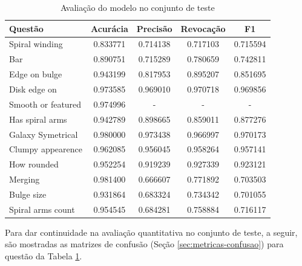 \begin{table}[!ht]
  \centering
  \caption{Avaliação do modelo no conjunto de teste}
  \label{tab:test-metrics}
  \begin{tabular}{lcccc}
    \toprule
    Questão            & Acurácia & Precisão & Revocação & F1       \\
    \midrule
    Spiral winding     & 0.833771 & 0.714138 & 0.717103  & 0.715594 \\
    Bar                & 0.890751 & 0.715289 & 0.780659  & 0.742811 \\
    Edge on bulge      & 0.943199 & 0.817953 & 0.895207  & 0.851695 \\
    Disk edge on       & 0.973585 & 0.969010 & 0.970718  & 0.969856 \\
    Smooth or featured & 0.974996 & -        & -         & -        \\
    Has spiral arms    & 0.942789 & 0.898665 & 0.859011  & 0.877276 \\
    Galaxy Symetrical  & 0.980000 & 0.973438 & 0.966997  & 0.970173 \\
    Clumpy appearence  & 0.962085 & 0.956045 & 0.958264  & 0.957141 \\
    How rounded        & 0.952254 & 0.919239 & 0.927339  & 0.923121 \\
    Merging            & 0.981400 & 0.666607 & 0.771892  & 0.703503 \\
    Bulge size         & 0.931864 & 0.683324 & 0.734342  & 0.701055 \\
    Spiral arms count  & 0.954545 & 0.684281 & 0.758884  & 0.716117 \\
    \bottomrule
  \end{tabular}
\end{table}

Para dar continuidade na avaliação quantitativa no conjunto de teste, a seguir, são mostradas as matrizes de confusão (Seção \ref{sec:metricas-confusao}) para questão da Tabela \ref{tab:test-metrics}.


